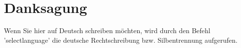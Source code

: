 \clearpage
\chapter*{\textbf{Danksagung}}\label{danksagung}

Wenn Sie hier auf Deutsch schreiben möchten, wird durch den Befehl 'selectlanguage' die deutsche Rechtschreibung bzw. Silbentrennung aufgerufen.